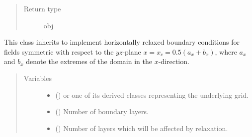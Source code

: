\documentclass[letterpaper,10pt,english]{sphinxmanual}
\begin{document}
\begin{fulllineitems}
\begin{fulllineitems}
\begin{quote}
\begin{description}
\item[{Return type}] \leavevmode
obj

\end{description}\end{quote}

\end{fulllineitems}


\end{fulllineitems}


\begin{fulllineitems}
\label{\detokenize{api:tasmania.dycore.horizontal_boundary_relaxed.RelaxedSymmetricYZ}}
This class inherits {\hyperref[\detokenize{api:tasmania.dycore.horizontal_boundary_relaxed.Relaxed}]{}} to implement horizontally
relaxed boundary conditions for fields symmetric with respect to the \(yz\)-plane \(x = x_c = 0.5 (a_x + b_x)\),
where \(a_x\) and \(b_x\) denote the extremes of the domain in the \(x\)-direction.
\begin{quote}\begin{description}
\item[{Variables}] \leavevmode\begin{itemize}
\item {} 
 () \textendash{} {\hyperref[\detokenize{api:tasmania.grids.grid_xyz.GridXYZ}]{}} or one of its derived classes representing the underlying grid.

\item {} 
{\hyperref[\detokenize{api:tasmania.dycore.prognostic_isentropic.PrognosticIsentropic.nb}]{}} () \textendash{} Number of boundary layers.

\item {} 
 () \textendash{} Number of layers which will be affected by relaxation.

\end{itemize}

\end{description}\end{quote}


\end{fulllineitems}
\end{document}
